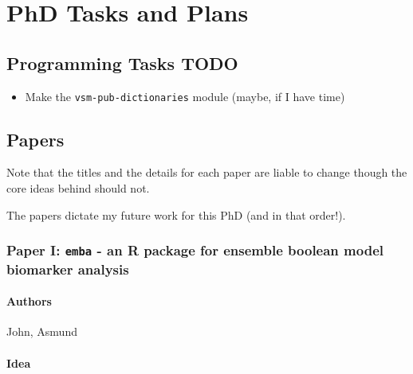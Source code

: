 \documentclass[
  12pt,
]{book}
\providecommand{\tightlist}{%
  \setlength{\itemsep}{0pt}\setlength{\parskip}{0pt}}
\begin{document}
\hypertarget{plans}{%
\chapter{PhD Tasks and Plans}\label{plans}}

\hypertarget{programming-tasks-todo}{%
\section{Programming Tasks TODO}\label{programming-tasks-todo}}

\begin{itemize}
\tightlist
\item
  Make the \texttt{vsm-pub-dictionaries} module (maybe, if I have time)
\end{itemize}

\hypertarget{papers}{%
\section{Papers}\label{papers}}

Note that the titles and the details for each paper are liable to change though the core ideas behind should not.

The papers dictate my future work for this PhD (and in that order!).

\hypertarget{paper-i-emba---an-r-package-for-ensemble-boolean-model-biomarker-analysis}{%
\subsection*{\texorpdfstring{Paper I: \texttt{emba} - an R package for ensemble boolean model biomarker analysis}{Paper I: emba - an R package for ensemble boolean model biomarker analysis}}\label{paper-i-emba---an-r-package-for-ensemble-boolean-model-biomarker-analysis}}

\hypertarget{authors}{%
\subsubsection*{Authors}\label{authors}}

John, Asmund

\hypertarget{idea}{%
\subsubsection*{Idea}\label{idea}}
\end{document}

